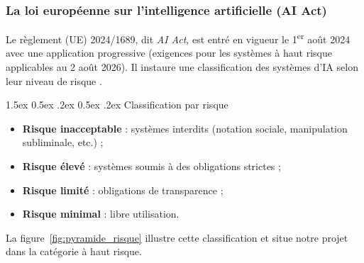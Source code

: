 \documentclass[12pt,a4paper]{article}
\makeatletter
\renewcommand\paragraph{\@startsection{paragraph}{4}{\z@}%
  {1.5ex \@plus 0.5ex \@minus .2ex}%
  {0.5ex \@plus .2ex}%
  {\normalfont\normalsize\bfseries}}
\makeatother
\begin{document}
\subsubsection{La loi européenne sur l'intelligence artificielle (AI Act)}

Le règlement (UE) 2024/1689, dit \textit{AI Act}, est entré en vigueur le 1\textsuperscript{er} août 2024 avec une application progressive (exigences pour les systèmes à haut risque applicables au 2 août 2026). Il instaure une classification des systèmes d'IA selon leur niveau de risque \cite{ia_act}.

\paragraph{Classification par risque}
\begin{itemize}
    \item \textbf{Risque inacceptable} : systèmes interdits (notation sociale, manipulation subliminale, etc.) ;
    \item \textbf{Risque élevé} : systèmes soumis à des obligations strictes ;
    \item \textbf{Risque limité} : obligations de transparence ;
    \item \textbf{Risque minimal} : libre utilisation.
\end{itemize}

\noindent La figure~\ref{fig:pyramide_risque} illustre cette classification et situe notre projet dans la catégorie à haut risque.
\end{document}
